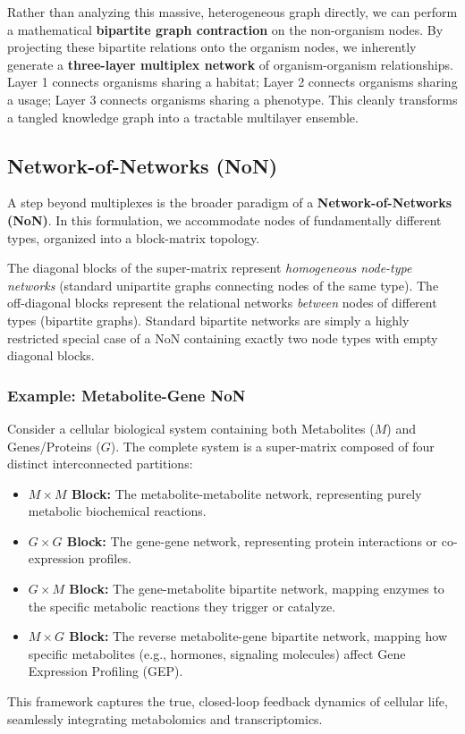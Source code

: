 Rather than analyzing this massive, heterogeneous graph directly, we can perform a mathematical \textbf{bipartite graph contraction} on the non-organism nodes. By projecting these bipartite relations onto the organism nodes, we inherently generate a \textbf{three-layer multiplex network} of organism-organism relationships. Layer 1 connects organisms sharing a habitat; Layer 2 connects organisms sharing a usage; Layer 3 connects organisms sharing a phenotype. This cleanly transforms a tangled knowledge graph into a tractable multilayer ensemble.

\subsection{Network-of-Networks (NoN)}
\label{subsec:network_of_networks}

A step beyond multiplexes is the broader paradigm of a \textbf{Network-of-Networks (NoN)}. In this formulation, we accommodate nodes of fundamentally different types, organized into a block-matrix topology.

The diagonal blocks of the super-matrix represent \textit{homogeneous node-type networks} (standard unipartite graphs connecting nodes of the same type). The off-diagonal blocks represent the relational networks \textit{between} nodes of different types (bipartite graphs). Standard bipartite networks are simply a highly restricted special case of a NoN containing exactly two node types with empty diagonal blocks.


\subsubsection{Example: Metabolite-Gene NoN}
\label{subsubsec:metabolite_gene_non}

Consider a cellular biological system containing both Metabolites ($M$) and Genes/Proteins ($G$). The complete system is a super-matrix composed of four distinct interconnected partitions:
\begin{itemize}
    \item \textbf{$M \times M$ Block:} The metabolite-metabolite network, representing purely metabolic biochemical reactions.
    \item \textbf{$G \times G$ Block:} The gene-gene network, representing protein interactions or co-expression profiles.
    \item \textbf{$G \times M$ Block:} The gene-metabolite bipartite network, mapping enzymes to the specific metabolic reactions they trigger or catalyze.
    \item \textbf{$M \times G$ Block:} The reverse metabolite-gene bipartite network, mapping how specific metabolites (e.g., hormones, signaling molecules) affect Gene Expression Profiling (GEP).
\end{itemize}
This framework captures the true, closed-loop feedback dynamics of cellular life, seamlessly integrating metabolomics and transcriptomics.


